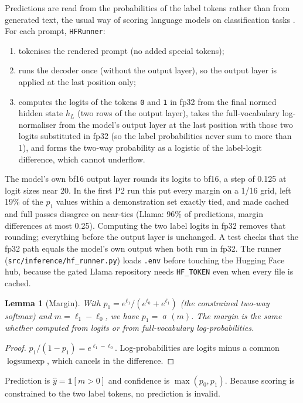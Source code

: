 \documentclass[11pt,a4paper]{article}
\newcommand{\1}{\mathbf{1}}
\DeclareMathOperator{\sigmoid}{\sigma}
\DeclareMathOperator{\logsumexp}{logsumexp}
\theoremstyle{plain}
\newtheorem{lemma}[theorem]{Lemma}
\theoremstyle{definition}
\theoremstyle{remark}
\begin{document}
Predictions are read from the probabilities of the label tokens rather than
from generated text, the usual way of scoring language models on
classification tasks \citep{brown2020language,zhao2021calibrate}.
For each prompt, \texttt{HFRunner}:
\begin{enumerate}[nosep]
  \item tokenises the rendered prompt (no added special tokens);
  \item runs the decoder once (without the output layer), so the output
        layer is applied at the last position only;
  \item computes the logits of the tokens \texttt{0} and \texttt{1} in fp32
        from the final normed hidden state $h_L$ (two rows of the output
        layer), takes the full-vocabulary log-normaliser from the model's
        output layer at the last position with those two logits substituted
        in fp32 (so the label probabilities never sum to more than 1), and
        forms the two-way probability as a logistic of the label-logit
        difference, which cannot underflow.
\end{enumerate}
The model's own bf16 output layer rounds its logits to bf16, a step of
0.125 at logit sizes near 20. In the first P2 run this put every margin on
a 1/16 grid, left 19\% of the $p_1$ values within a demonstration set exactly
tied, and made cached and full passes disagree on near-ties (Llama: 96\% of
predictions, margin differences at most 0.25). Computing the two label
logits in fp32 removes that rounding; everything before the output layer is
unchanged. A test checks that the fp32 path equals the model's own output
when both run in fp32.
The runner (\texttt{src/inference/hf\_runner.py}) loads \texttt{.env}
before touching the Hugging Face hub, because the gated Llama repository
needs \texttt{HF\_TOKEN} even when every file is cached.

\begin{lemma}[Margin]
\label{lem:margin}
With $p_1 = e^{\ell_1}/(e^{\ell_0} + e^{\ell_1})$ (the constrained two-way
softmax) and $m = \ell_1 - \ell_0$, we have $p_1 = \sigmoid(m)$. The margin
is the same whether computed from logits or from full-vocabulary
log-probabilities.
\end{lemma}
\begin{proof}
$p_1/(1-p_1) = e^{\ell_1 - \ell_0}$. Log-probabilities are logits minus a
common $\logsumexp$, which cancels in the difference.
\end{proof}

Prediction is $\hat y = \1[m > 0]$ and confidence is $\max(p_0, p_1)$.
Because scoring is constrained to the two label tokens, no prediction is
invalid.
\end{document}
